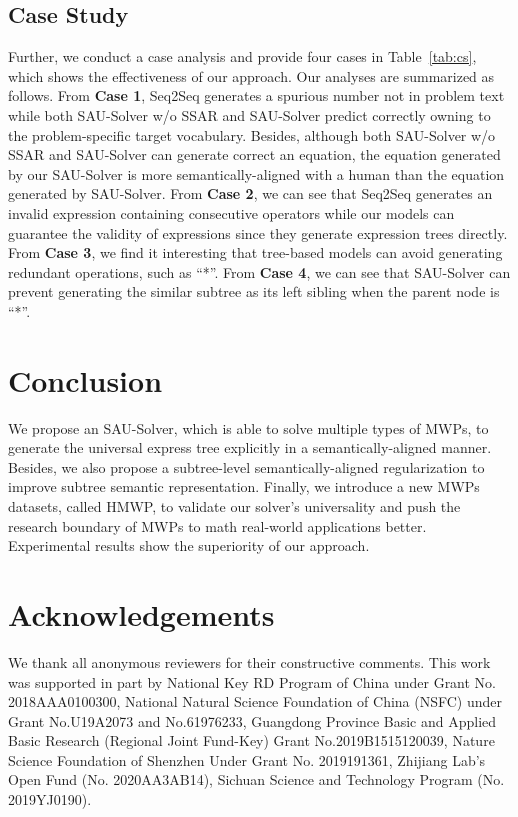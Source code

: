 \documentclass[11pt,a4paper]{article}
\begin{document}
\subsection{Case Study}
Further, we conduct a case analysis and provide four cases in Table~\ref{tab:cs}, which shows the effectiveness of our approach. Our analyses are summarized as follows. From \textbf{Case 1}, Seq2Seq generates a spurious number  not in problem text while both SAU-Solver w/o SSAR and SAU-Solver predict correctly owning to the problem-specific target vocabulary. Besides, although both SAU-Solver w/o SSAR and SAU-Solver can generate correct an equation, the equation generated by our SAU-Solver is more semantically-aligned with a human than the equation generated by SAU-Solver. From \textbf{Case 2}, we can see that Seq2Seq generates an invalid expression containing consecutive operators while our models can guarantee the validity of expressions since they generate expression trees directly. From \textbf{Case 3}, we find it interesting that tree-based models can avoid generating redundant operations, such as ``*''. From \textbf{Case 4}, we can see that SAU-Solver can prevent generating the similar subtree as its left sibling when the parent node is ``*''. 

\section{Conclusion}
We propose an SAU-Solver, which is able to solve multiple types of MWPs, to generate the universal express tree explicitly in a semantically-aligned manner. Besides, we also propose a subtree-level semantically-aligned regularization to improve subtree semantic representation. Finally, we introduce a new MWPs datasets, called HMWP, to validate our solver's universality and push the research boundary of MWPs to math real-world applications better. Experimental results show the superiority of our approach.


\section*{Acknowledgements}
We thank all anonymous reviewers for their constructive comments. This work was supported in part by National Key RD Program of China under Grant No. 2018AAA0100300, National Natural Science Foundation of China (NSFC) under Grant No.U19A2073 and No.61976233, Guangdong Province Basic and Applied Basic Research (Regional Joint Fund-Key) Grant No.2019B1515120039, Nature Science Foundation of Shenzhen Under Grant No. 2019191361, Zhijiang Lab’s Open Fund (No. 2020AA3AB14), Sichuan Science and Technology Program (No. 2019YJ0190). 



\end{document}
